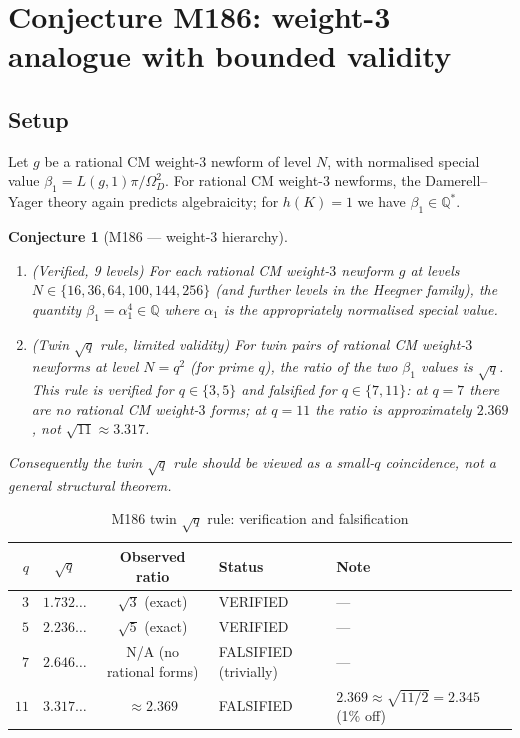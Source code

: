 \documentclass[12pt]{amsart}
\newtheorem{conjecture}[theorem]{Conjecture}
\theoremstyle{definition}
\newcommand{\Q}{\mathbb{Q}}
\newcommand{\Omega}{\varOmega}
\begin{document}
\section{Conjecture M186: weight-3 analogue with bounded validity}
\label{sec:M186}

\subsection{Setup}

Let $g$ be a rational CM weight-$3$ newform of level $N$, with normalised
special value $\beta_1 = L(g,1)\pi / \Omega_D^2$.
For rational CM weight-$3$ newforms, the Damerell--Yager theory again predicts
algebraicity; for $h(K) = 1$ we have $\beta_1 \in \Q^*$.

\begin{conjecture}[M186 --- weight-$3$ hierarchy]
  \label{conj:M186}
  \leavevmode
  \begin{enumerate}
    \item \textup{(Verified, 9 levels)} For each rational CM weight-$3$ newform $g$ at
      levels $N \in \{16, 36, 64, 100, 144, 256\}$ (and further levels in the
      Heegner family), the quantity $\beta_1 = \alpha_1^4 \in \Q$ where
      $\alpha_1$ is the appropriately normalised special value.

    \item \textup{(Twin $\sqrt{q}$ rule, limited validity)} For twin pairs of rational
      CM weight-$3$ newforms at level $N = q^2$ (for prime $q$), the ratio
      of the two $\beta_1$ values is $\sqrt{q}$.
      This rule is \emph{verified} for $q \in \{3, 5\}$
      and \emph{falsified} for $q \in \{7, 11\}$:
      at $q = 7$ there are no rational CM weight-$3$ forms;
      at $q = 11$ the ratio is approximately $2.369$, not $\sqrt{11} \approx 3.317$.
  \end{enumerate}
  Consequently the twin $\sqrt{q}$ rule should be viewed as a small-$q$
  coincidence, not a general structural theorem.
\end{conjecture}

\begin{table}[h]
  \caption{M186 twin $\sqrt{q}$ rule: verification and falsification}
  \label{tab:M186}
  \renewcommand{\arraystretch}{1.25}
  \begin{tabular}{rccll}
    \toprule
    $q$ & $\sqrt{q}$ & Observed ratio & Status & Note \\
    \midrule
    $3$ & $1.732\ldots$ & $\sqrt{3}$ (exact) & VERIFIED & --- \\
    $5$ & $2.236\ldots$ & $\sqrt{5}$ (exact) & VERIFIED & --- \\
    $7$ & $2.646\ldots$ & N/A (no rational forms) & FALSIFIED (trivially) & --- \\
    $11$& $3.317\ldots$ & $\approx 2.369$ & FALSIFIED & $2.369 \approx \sqrt{11/2} = 2.345$ (1\% off) \\
    \bottomrule
  \end{tabular}
\end{table}
\end{document}
